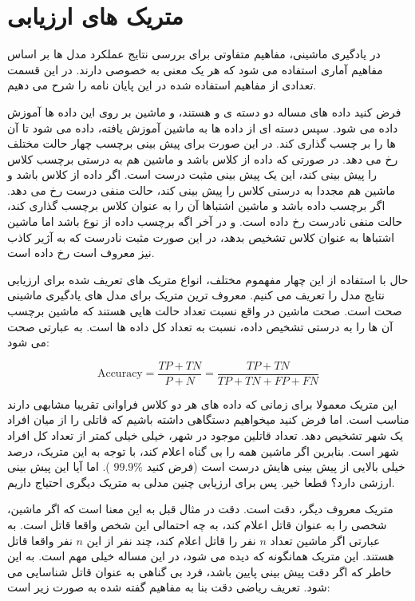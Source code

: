 \section{متریک های ارزیابی}

در یادگیری ماشینی، مفاهیم متفاوتی برای بررسی نتایج عملکرد مدل ها بر اساس مفاهیم آماری استفاده می شود که هر یک معنی به خصوصی دارند. در این قسمت تعدادی از مفاهیم استفاده شده در این پایان نامه را شرح می دهیم.

فرض کنید داده های مساله دو دسته ی
و
هستند، و ماشین بر روی این داده ها آموزش داده می شود.
سپس دسته ای از داده ها به ماشین آموزش یافته، داده می شود تا آن ها را بر چسب گذاری کند.
در این صورت برای پیش بینی برچسب
چهار حالت مختلف رخ می دهد.
در صورتی که داده از کلاس
باشد و ماشین هم به درستی برچسب کلاس
را پیش بینی کند، این یک پیش بینی مثبت درست
است.
اگر داده از کلاس
باشد و ماشین هم مجددا به درستی کلاس
را پیش بینی کند، حالت منفی درست
رخ می دهد.
اگر برچسب داده
باشد و ماشین اشتباها آن را به عنوان کلاس
برچسب گذاری کند، حالت منفی نادرست
رخ داده است.
و در آخر اگه برچسب داده از نوع
باشد اما ماشین اشتباها به عنوان کلاس
تشخیص بدهد، در این صورت مثبت نادرست
که به آژیر کاذب نیز معروف است رخ داده است.

حال با استفاده از این چهار مفهموم مختلف، انواع متریک های تعریف شده برای ارزیابی نتایج مدل را تعریف می کنیم. معروف ترین متریک برای مدل های یادگیری ماشینی صحت
است. صحت ماشین در واقع نسبت تعداد حالت هایی هستند که ماشین برچسب آن ها را به درستی تشخیص داده، نسبت به تعداد کل داده ها است. به عبارتی صحت می شود:

\begin{equation}\label{eqn:acc}
\text{Accuracy} = \frac{TP+TN}{P+N} = \frac{TP+TN}{TP+TN+FP+FN}
\end{equation}

این متریک معمولا برای زمانی که داده های هر دو کلاس فراوانی تقریبا مشابهی دارند مناسب است. اما فرض کنید میخواهیم دستگاهی داشته باشیم که قاتلی را از میان افراد یک شهر تشخیص دهد. تعداد قاتلین موجود در شهر، خیلی خیلی کمتر از تعداد کل افراد شهر است. بنابرین اگر ماشین همه را بی گناه اعلام کند، با توجه به این متریک، درصد خیلی بالایی از پیش بینی هایش درست است‌ (فرض کنید
$99.9\%$
).
اما آیا این پیش بینی ارزشی دارد؟ قطعا خیر. پس برای ارزیابی چنین مدلی به متریک دیگری احتیاج داریم.

متریک معروف دیگر، دقت
است. دقت در مثال قبل به این معنا است که اگر ماشین، شخصی را به عنوان قاتل اعلام کند، به چه احتمالی این شخص واقعا قاتل است. به عبارتی اگر ماشین تعداد
$n$
نفر را قاتل اعلام کند، چند نفر از این
$n$
نفر واقعا قاتل هستند. این متریک همانگونه که دیده می شود، در این مساله خیلی مهم است. به این خاطر که اگر دقت پیش بینی پایین باشد، فرد بی گناهی به عنوان قاتل شناسایی می شود. تعریف ریاضی دقت بنا به مفاهیم گفته شده به صورت زیر است:


